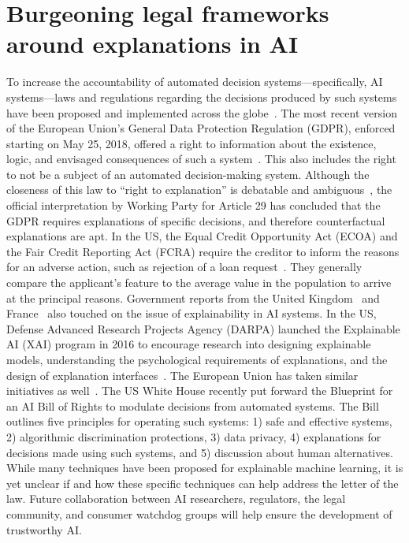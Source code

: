 \section{Burgeoning legal frameworks around explanations in AI}
\label{sec:legal}
To increase the accountability of automated decision systems---specifically, AI systems---laws and regulations regarding the decisions produced by such systems have been proposed and implemented across the globe~\citep{AI-Accountability:2017}. 
The most recent version of the European Union's General Data Protection Regulation (GDPR), enforced starting on May 25, 2018, offered a right to information about the existence, logic, and envisaged consequences of such a system~\citep{Euro-GDPR2}. This also includes the right to not be a subject of an automated decision-making system. 
Although the closeness of this law to ``right to explanation'' is debatable and ambiguous~\citep{right-to-explanation-gdpr}, the official interpretation by Working Party for Article 29 has concluded that the GDPR requires explanations of specific decisions, and therefore counterfactual explanations are apt. 
In the US, the Equal Credit Opportunity Act (ECOA) and the Fair Credit Reporting Act (FCRA) require the creditor to inform the reasons for an adverse action, such as rejection of a loan request~\citep{ECOA1,ECOA2}. They generally compare the applicant's feature to the average value in the population to arrive at the principal reasons. 
Government reports from the United Kingdom~\citep{UK-XAI1} and France~\citep{Fr-XAI1,Fr-XAI2} also touched on the issue of explainability in AI systems. 
In the US, Defense Advanced Research Projects Agency (DARPA) launched the Explainable AI (XAI) program in 2016 to encourage research into designing explainable models, understanding the psychological requirements of explanations, and the design of explanation interfaces~\citep{DARPA1}. 
The European Union has taken similar initiatives as well~\citep{EU-XAIfund1,EU-XAIfund2}. 
The US White House recently put forward the Blueprint for an AI Bill of Rights \citep{blueprints-bill-of-rights} to modulate decisions from automated systems. 
The Bill outlines five principles for operating such systems: 1) safe and effective systems, 2) algorithmic discrimination protections, 3) data privacy, 4) explanations for decisions made using such systems, and 5) discussion about human alternatives. 
While many techniques have been proposed for explainable machine learning, it is yet unclear if and how these specific techniques can help address the letter of the law. Future collaboration between AI researchers, regulators, the legal community, and consumer watchdog groups will help ensure the development of trustworthy AI.


